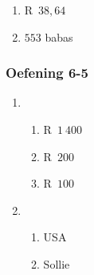 {\begin{multicols}{3}
\begin{enumerate}[label=\textbf{\arabic*}.]
	\item R~$38,64$%

	\item $553$ babas%
    \end{enumerate}


\subsubsection*{Oefening 6-5} %

    \begin{enumerate}[noitemsep, label=\textbf{\arabic*}.]
	\item %
	\begin{enumerate}[noitemsep, label=\textbf{(\alph*)} ]
	    \item R~$1~400$%
	    \item R~$200$%
	    \item R~$100$%
	\end{enumerate}

	\item %
	
	\begin{enumerate}[noitemsep, label=\textbf{(\alph*)} ]
	    \item USA %

	    \item Sollie %
	\end{enumerate}
    \end{enumerate}




\end{multicols}}
